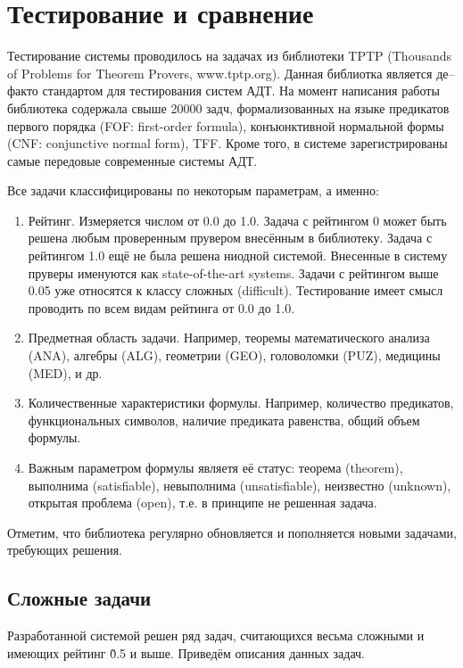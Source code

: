 \section{Тестирование и сравнение}

Тестирование системы проводилось на задачах из библиотеки TPTP (Thousands of Problems for Theorem Provers, www.tptp.org). Данная библиотка является де--факто стандартом для тестирования систем АДТ. На момент написания работы библиотека содержала свыше 20000 задч, формализованных на языке предикатов первого порядка (FOF: first-order formula), конъюнктивной нормальной формы (CNF: conjunctive normal form), TFF. Кроме того, в системе зарегистрированы самые передовые современные системы АДТ.

Все задачи классифицированы по некоторым параметрам, а именно:
\begin{enumerate}
\item Рейтинг. Измеряется числом от 0.0 до 1.0. Задача с рейтингом 0 может быть решена любым проверенным прувером внесённым в библиотеку. Задача с рейтингом 1.0 ещё не была решена ниодной системой. Внесенные в систему пруверы именуются как state-of-the-art systems. Задачи с рейтингом выше 0.05 уже относятся к классу сложных (difficult). Тестирование имеет смысл проводить по всем видам рейтинга от 0.0 до 1.0.
\item Предметная область задачи. Например, теоремы математического анализа (ANA), алгебры (ALG), геометрии (GEO), головоломки (PUZ), медицины (MED), и др.
\item Количественные характеристики формулы. Например, количество предикатов, функциональных символов, наличие предиката равенства, общий объем формулы.
\item Важным параметром формулы являетя её статус: теорема (theorem), выполнима (satisfiable), невыполнима (unsatisfiable), неизвестно (unknown), открытая проблема (open), т.е. в принципе не решенная задача.
\end{enumerate}

Отметим, что библиотека регулярно обновляется и пополняется новыми задачами, требующих решения.




\subsection{Сложные задачи}
Разработанной системой решен ряд задач, считающихся весьма сложными и имеющих рейтинг \~0.5 и выше. Приведём описания данных задач.

